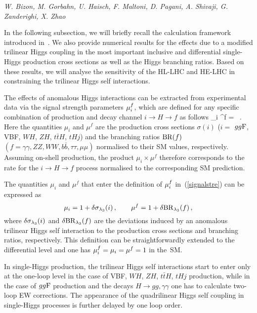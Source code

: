\begin{center}
\textit{W. Bizon, M. Gorbahn, U. Haisch, F. Maltoni, D. Pagani, A. Shivaji, G. Zanderighi, X. Zhao}
\end{center}

In the following subsection, we will briefly recall the calculation framework introduced in~\cite{Gorbahn:2016uoy,Degrassi:2016wml}. We also provide  numerical results for the effects due to a modified  trilinear Higgs coupling in the most important inclusive and differential single-Higgs production cross sections as well as the Higgs branching ratios. Based on these results, we will analyse the sensitivity of the HL-LHC and HE-LHC in constraining the trilinear Higgs self interactions. 

\label{tril-single:theo}

The effects of anomalous Higgs interactions can be extracted from experimental data via the signal strength parameters $\mu_i^f$, which
are defined for any specific combination of production and decay channel $i \to H \to f$ as follows 
\be \label{signalstre}
\muif \equiv \mu_i \times \mu^f =  \times {} \, .
\ee 
Here the quantities $\mu_i$ and $\mu^f$ are   the production cross sections $\sigma(i)$ ($i=$ $gg{\rm F}$, {\rm VBF}, $WH$, $ZH$, $t \bar tH$, $tHj$) and the branching ratios ${\rm BR}(f)$ $(f= \gamma\gamma, ZZ, WW, b\bar{b}, \tau\tau, \mu\mu)$ normalised to their SM values, respectively. Assuming on-shell production, the product $\mu_i \times \mu^f$  therefore corresponds to the rate for the $i \to H \to f$ process  normalised to the corresponding SM prediction.

The quantities $\mu_i$ and $\mu^f$ that enter the definition of  $\mu_i^f$ in~(\ref{signalstre})  can be expressed as
\begin{equation} \label{eq:muf}
\mu_i = 1 + \delta \sigma_{\lambda_{3}}(i) \,,  \qquad 
\mu^f = 1 + \delta {\rm BR}_{\lambda_{3}}(f) \,,
\end{equation}
where $\delta \sigma_{\lambda_{3}}(i)$ and $\delta {\rm BR}_{\lambda_{3}}(f)$ are the deviations induced by an anomalous trilinear Higgs self interaction to the production cross sections and branching ratios, respectively.
This definition can be straightforwardly extended to the differential level and one has $\mu_i^f=\mu_i=\mu^f=1$ in the~SM.

In single-Higgs production, the trilinear Higgs self interactions start to enter only at the one-loop level in the case of VBF, $WH$, $ZH$, $t \bar tH$, $tHj$ production, while in the case of $gg{\rm F}$ production and the decays $H\to gg, \gamma \gamma$ one has to calculate two-loop EW corrections. The appearance of the quadrilinear Higgs self coupling in single-Higgs processes is further delayed by one loop order.

